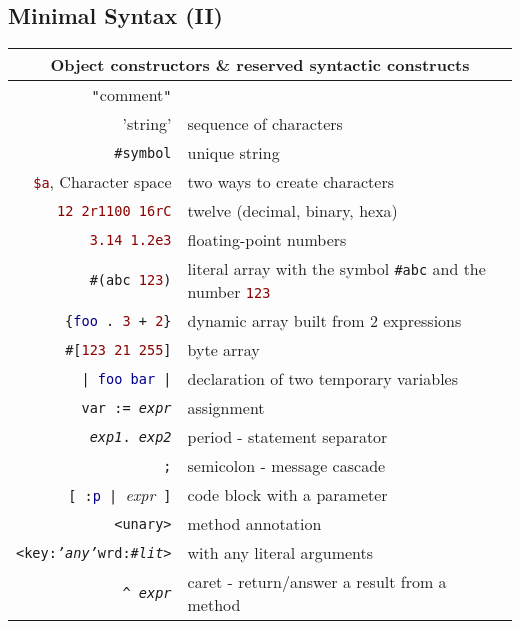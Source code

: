 \documentclass[notumble]{leaflet}
\newcommand{\code}[1]{\foreignlanguage{english}{\texttt{#1}}}
\begin{document}
\subsection{Minimal Syntax (II)}
\noindent
\begin{tabularx}{\linewidth}{@{}rX@{}}
        \toprule
        \multicolumn{2}{c}{Object constructors \& reserved syntactic constructs}\\
        \midrule
        \textcolor{comment}{\code{"}{comment}\code{"}}& \\
        \textcolor{string}{'string'}&sequence of characters\\
        \textcolor{string}{\code{\#symbol}}&unique string\\
        \textcolor{darkRed}{\code{\$a}}, Character space&two ways to create characters\\
        \textcolor{darkRed}{\code{12 2r1100 16rC}}&twelve (decimal, binary, hexa)\\
        \textcolor{darkRed}{\code{3.14 1.2e3}}&floating-point numbers\\
        \code{\#(\textcolor{string}{abc} \textcolor{darkRed}{123})}&literal array with the symbol \textcolor{string}{\code{\#abc}} and the number \textcolor{darkRed}{\code{123}} \\
        \code{\{\textcolor{darkBlue}{foo}\,.\ \textcolor{darkRed}{3}\,+\,\textcolor{darkRed}{2}\}}&dynamic array built from 2 expressions\\
        \code{\#[\textcolor{darkRed}{123 21 255}]} &byte array \\ 
        \midrule
        
        \code{|\,\textcolor{darkBlue}{foo bar}\,|} &declaration of two temporary variables \\
        \code{var := \emph{expr}}&assignment \\
        \code{\emph{exp1}. \emph{exp2}} &period -  statement separator\\
        \code{;} &semicolon - message cascade\\
        \code{[\,:\textcolor{darkBlue}{p}\,|\,}\emph{expr}\code{\,]} &code block with a parameter \\
        \code{<unary>}&method annotation \\
        \code{<key:\emph{'any'}wrd:\emph{\#lit}>}&with any literal arguments\\
        \code{\textasciicircum\ \emph{expr}} &caret - return/answer a result from a method\\
        \bottomrule
\end{tabularx}
\end{document}
